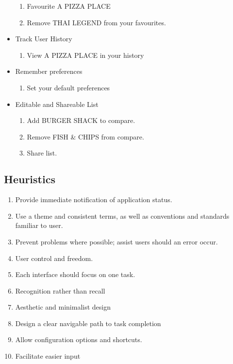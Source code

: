 \documentclass[a4 paper, 10pt]{article}
\begin{document}
\begin{multicols}{2}
\begin{itemize}
                    \begin{enumerate}[resume]
                        \item Favourite A PIZZA PLACE
                        \item Remove THAI LEGEND from your favourites.
                    \end{enumerate}
                \item Track User History
                    \begin{enumerate}[resume]
                        \item View A PIZZA PLACE in your history
                    \end{enumerate}
                \item Remember preferences
                    \begin{enumerate}[resume]
                        \item Set your default preferences
                    \end{enumerate}
                \item Editable and Shareable List
                    \begin{enumerate}[resume]
                        \item Add BURGER SHACK to compare.
                        \item Remove FISH \& CHIPS from compare.
                        \item Share list.
                    \end{enumerate}
            \end{itemize}
        \end{multicols}

    \subsection*{Heuristics}
        \begin{enumerate}
            \item Provide immediate notification of application status.
            \item Use a theme and consistent terms, as well as conventions and standards familiar to user. 
            \item Prevent problems where possible; assist users should an error occur.
            \item User control and freedom.
            \item Each interface should focus on one task. 
            \item Recognition rather than recall
            \item Aesthetic and minimalist design
            \item Design a clear navigable path to task completion  
            \item Allow configuration options and shortcuts.
            \item Facilitate easier input
        \end{enumerate}
    
\end{document}
